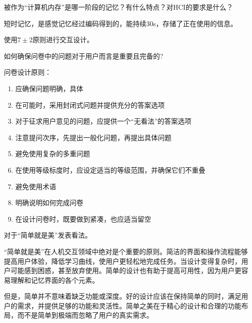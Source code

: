 \begin{problem}[2016]
被作为“计算机内存”是哪一阶段的记忆？有什么特点？对HCI的要求是什么？
\end{problem}

\begin{solution}
短时记忆，是感觉记忆经过编码得到的，能持续30s，存储了正在使用的信息。

使用$7 \pm 2$原则进行交互设计。
\end{solution}



\begin{problem}[2012、2014]
如何确保问卷中的问题对于用户而言是重要且完备的?
\end{problem}

\begin{solution}
问卷设计原则：
\vspace{-0.8em}
\begin{multicols}{2}
    \begin{enumerate}[label=\arabic*.]
        \item 应确保问题明确，具体
        \item 在可能时，采用封闭式问题并提供充分的答案选项
        \item 对于征求用户意见的问题，应提供一个“无看法”的答案选项
        \item 注意提问次序，先提出一般化问题，再提出具体问题
        \item 避免使用复杂的多重问题
        \item 在使用等级标度时，应设定适当的等级范围，并确保它们不重叠
        \item 避免使用术语
        \item 明确说明如何完成问卷
        \item 在设计问卷时，既要做到紧凑，也应适当留空
    \end{enumerate}
\end{multicols}
\vspace{-1em}
\end{solution}



\begin{problem}[2014]
对于“简单就是美”发表看法。
\end{problem}

\begin{solution}
“简单就是美”在人机交互领域中绝对是个重要的原则。简洁的界面和操作流程能够提高用户体验，降低学习曲线，使用户更轻松地完成任务。当设计变得复杂时，用户可能感到困惑，甚至放弃使用。简单的设计也有助于提高可用性，因为用户更容易理解和记忆界面的各个元素。

但是，简单并不意味着缺乏功能或深度。好的设计应该在保持简单的同时，满足用户的需求，并提供足够的功能和灵活性。简单之美在于精心的设计和合理的功能布局，而不是简单到极端而忽略了用户的真实需求。
\end{solution}



